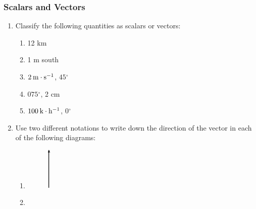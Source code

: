             \subsubsection{  Scalars and Vectors }
            \nopagebreak
        \label{m38812*id187475}\begin{enumerate}[noitemsep, label=\textbf{\arabic*}. ] 
            \label{m38812*uid8}\item Classify the following quantities as scalars or vectors:
\label{m38812*id187490}\begin{enumerate}[noitemsep, label=\textbf{\alph*}. ] 
            \label{m38812*uid9}\item 12 km
\label{m38812*uid10}\item 1 m south
\label{m38812*uid11}\item $2\phantom{\rule{2pt}{0ex}}\mathrm{m}\ensuremath{\cdot}{\mathrm{s}}^{-1}$, $45{}^{\circ }$\label{m38812*uid12}\item $075{}^{\circ }$, 2 cm
\label{m38812*uid13}\item $100\phantom{\rule{2pt}{0ex}}\mathrm{k}\ensuremath{\cdot}{\mathrm{h}}^{-1}$, $0{}^{\circ }$\end{enumerate}
                \label{m38812*uid14}\item Use two different notations to write down the direction of the vector in each of the following diagrams:
\label{m38812*id187643}\begin{enumerate}[noitemsep, label=\textbf{\alph*}. ] 
            \label{m38812*uid15}\item 
    \setcounter{subfigure}{0}
	\begin{figure}[H] %
    \begin{center}
    \label{m38812*id187654!!!underscore!!!media}\label{m38812*id187654!!!underscore!!!printimage}\includegraphics[height=2cm]{col11305.imgs/m38812_PG11C1_007.png} %
      \vspace{2pt}
    \vspace{.1in}
    \end{center}
 \end{figure}       \label{m38812*uid16}\item 
    \setcounter{subfigure}{0}
	\begin{figure}[H] %

\end{figure}
\end{enumerate}
\end{enumerate}
